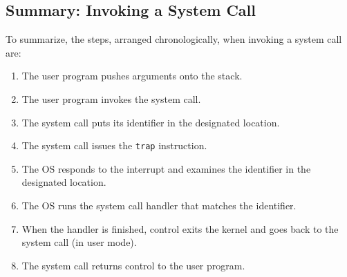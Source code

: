\subsection*{Summary: Invoking a System Call}

To summarize, the steps, arranged chronologically, when invoking a system call are:
\begin{enumerate}
	\item The user program pushes arguments onto the stack.
	\item The user program invokes the system call.
	\item The system call puts its identifier in the designated location.
	\item The system call issues the \texttt{trap} instruction.
	\item The OS responds to the interrupt and examines the identifier in the designated location.
	\item The OS runs the system call handler that matches the identifier.
	\item When the handler is finished, control exits the kernel and goes back to the system call (in user mode).
	\item The system call returns control to the user program.

\end{enumerate}







